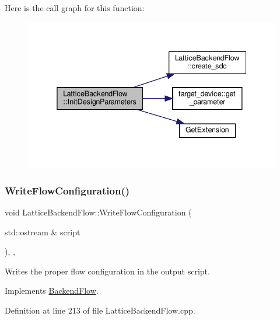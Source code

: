 Here is the call graph for this function\+:
\nopagebreak
\begin{figure}[H]
\begin{center}
\leavevmode
\includegraphics[width=338pt]{de/dd0/classLatticeBackendFlow_af31a3f147ec929266a696904d911ff6e_cgraph}
\end{center}
\end{figure}
\mbox{\label{classLatticeBackendFlow_aa0695e294b18773a1ec27fe86cf16408}} 
\subsubsection{\texorpdfstring{Write\+Flow\+Configuration()}{WriteFlowConfiguration()}}
{\footnotesize\ttfamily void Lattice\+Backend\+Flow\+::\+Write\+Flow\+Configuration (\begin{DoxyParamCaption}\item[{std\+::ostream \&}]{script }\end{DoxyParamCaption})\hspace{0.3cm}{\ttfamily [override]}, {\ttfamily [private]}, {\ttfamily [virtual]}}



Writes the proper flow configuration in the output script. 



Implements \hyperlink{classBackendFlow_acd93b1846b958eb6b7e10b9894bf5615}{Backend\+Flow}.



Definition at line 213 of file Lattice\+Backend\+Flow.\+cpp.



